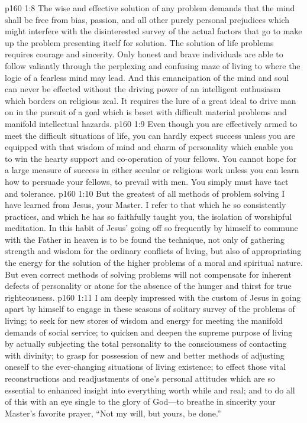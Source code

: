 \vs p160 1:8 The wise and effective solution of any problem demands that the mind shall be free from bias, passion, and all other purely personal prejudices which might interfere with the disinterested survey of the actual factors that go to make up the problem presenting itself for solution. The solution of life problems requires courage and sincerity. Only honest and brave individuals are able to follow valiantly through the perplexing and confusing maze of living to where the logic of a fearless mind may lead. And this emancipation of the mind and soul can never be effected without the driving power of an intelligent enthusiasm which borders on religious zeal. It requires the lure of a great ideal to drive man on in the pursuit of a goal which is beset with difficult material problems and manifold intellectual hazards.
\vs p160 1:9 Even though you are effectively armed to meet the difficult situations of life, you can hardly expect success unless you are equipped with that wisdom of mind and charm of personality which enable you to win the hearty support and co\hyp{}operation of your fellows. You cannot hope for a large measure of success in either secular or religious work unless you can learn how to persuade your fellows, to prevail with men. You simply must have tact and tolerance.
\pc \vs p160 1:10 But the greatest of all methods of problem solving I have learned from Jesus, your Master. I refer to that which he so consistently practices, and which he has so faithfully taught you, the isolation of worshipful meditation. In this habit of Jesus’ going off so frequently by himself to commune with the Father in heaven is to be found the technique, not only of gathering strength and wisdom for the ordinary conflicts of living, but also of appropriating the energy for the solution of the higher problems of a moral and spiritual nature. But even correct methods of solving problems will not compensate for inherent defects of personality or atone for the absence of the hunger and thirst for true righteousness.
\vs p160 1:11 I am deeply impressed with the custom of Jesus in going apart by himself to engage in these seasons of solitary survey of the problems of living; to seek for new stores of wisdom and energy for meeting the manifold demands of social service; to quicken and deepen the supreme purpose of living by actually subjecting the total personality to the consciousness of contacting with divinity; to grasp for possession of new and better methods of adjusting oneself to the ever\hyp{}changing situations of living existence; to effect those vital reconstructions and readjustments of one’s personal attitudes which are so essential to enhanced insight into everything worth while and real; and to do all of this with an eye single to the glory of God---to breathe in sincerity your Master’s favorite prayer, \textcolor{ubdarkred}{“Not my will, but yours, be done.”}
